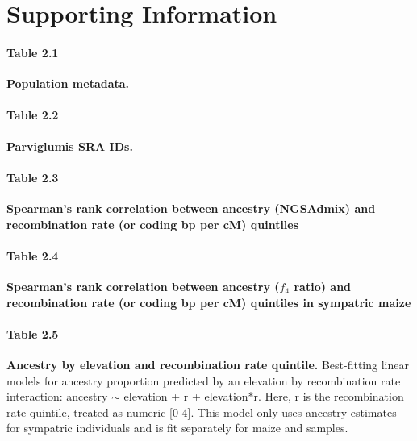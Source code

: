 \medskip






\newpage
\section*{Supporting Information}


\paragraph*{Table 2.1}
\label{population_metadata}
{\bf Population metadata.} 

\paragraph*{Table 2.2}
\label{parv50}
{\bf Parviglumis SRA IDs.} 

\paragraph*{Table 2.3}
\label{spearmans_rho_ngsadmix}
{\bf Spearman's rank correlation between \mexicana ancestry (NGSAdmix) and recombination rate (or coding bp per cM) quintiles}


\paragraph*{Table 2.4}
\label{spearmans_rho_f4_sympatric_maize_pop22}
{\bf Spearman's rank correlation between ancestry ($f_4$ ratio) and recombination rate (or coding bp per cM) quintiles in sympatric maize}


\paragraph*{Table 2.5}
\label{tbl_elev_r_interaction_5}
{\bf Ancestry by elevation and recombination rate quintile.} Best-fitting linear models for ancestry proportion predicted by an elevation by recombination rate interaction: \mexicana ancestry $\sim$ elevation + r + elevation*r. Here, r is the recombination rate quintile, treated as numeric [0-4]. This model only uses ancestry estimates for sympatric individuals and is fit separately for maize and \mexicana samples.


